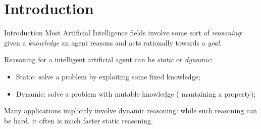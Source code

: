 \section*{Introduction}

\begin{frame}{Introduction}
    Most Artificial Intelligence fields involve some sort of \textit{reasoning}: given a \textit{knowledge} an agent reasons and acts rationally towards a \textit{goal}.

    Reasoning for a intelligent artificial agent can be \textit{static} or \textit{dynamic}:
    \begin{itemize}
        \item Static: solve a problem by exploiting some fixed knowledge;
        \item Dynamic: solve a problem with mutable knowledge (\eg{} mantaining a property);
    \end{itemize}


    Many applications implicitly involve dynamic reasoning: 
    while such reasoning can be hard, it often is much faster \wrt{} static reasoning.
\end{frame}

